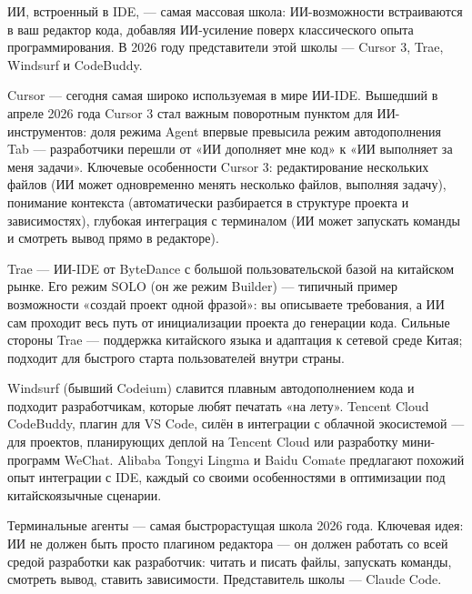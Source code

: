 
ИИ, встроенный в IDE, — самая массовая школа: ИИ-возможности встраиваются в ваш редактор кода, добавляя ИИ-усиление поверх классического опыта программирования. В 2026 году представители этой школы — Cursor 3, Trae, Windsurf и CodeBuddy.


Cursor — сегодня самая широко используемая в мире ИИ-IDE. Вышедший в апреле 2026 года Cursor 3 стал важным поворотным пунктом для ИИ-инструментов: доля режима Agent впервые превысила режим автодополнения Tab — разработчики перешли от «ИИ дополняет мне код» к «ИИ выполняет за меня задачи». Ключевые особенности Cursor 3: редактирование нескольких файлов (ИИ может одновременно менять несколько файлов, выполняя задачу), понимание контекста (автоматически разбирается в структуре проекта и зависимостях), глубокая интеграция с терминалом (ИИ может запускать команды и смотреть вывод прямо в редакторе).


Trae — ИИ-IDE от ByteDance с большой пользовательской базой на китайском рынке. Его режим SOLO (он же режим Builder) — типичный пример возможности «создай проект одной фразой»: вы описываете требования, а ИИ сам проходит весь путь от инициализации проекта до генерации кода. Сильные стороны Trae — поддержка китайского языка и адаптация к сетевой среде Китая; подходит для быстрого старта пользователей внутри страны.


Windsurf (бывший Codeium) славится плавным автодополнением кода и подходит разработчикам, которые любят печатать «на лету». Tencent Cloud CodeBuddy, плагин для VS Code, силён в интеграции с облачной экосистемой — для проектов, планирующих деплой на Tencent Cloud или разработку мини-программ WeChat. Alibaba Tongyi Lingma и Baidu Comate предлагают похожий опыт интеграции с IDE, каждый со своими особенностями в оптимизации под китайскоязычные сценарии.


Терминальные агенты — самая быстрорастущая школа 2026 года. Ключевая идея: ИИ не должен быть просто плагином редактора — он должен работать со всей средой разработки как разработчик: читать и писать файлы, запускать команды, смотреть вывод, ставить зависимости. Представитель школы — Claude Code.


